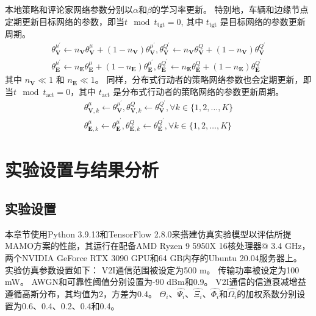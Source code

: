 本地策略和评论家网络参数分别以$\alpha$和$\beta$的学习率更新。
特别地，车辆和边缘节点定期更新目标网络的参数，即当$t \mod t_{\operatorname{tgt}} = 0$, 其中 $t_{\operatorname{tgt}}$ 是目标网络的参数更新周期。
\begin{align}
	\theta_{\mathbf{V}}^{\mu^{\prime}} \leftarrow n_{\mathbf{V}} \theta_{\mathbf{V}}^{\mu}+(1-n_{\mathbf{V}}) \theta_{\mathbf{V}}^{\mu^{\prime}}, \theta_{\mathbf{V}}^{Q^{\prime}} \leftarrow n_{\mathbf{V}} \theta_{\mathbf{V}}^{Q}+(1-n_{\mathbf{V}}) \theta_{\mathbf{V}}^{Q^{\prime}}\\
	\theta_{\mathbf{E}}^{\mu^{\prime}} \leftarrow n_{\mathbf{E}} \theta_{\mathbf{E}}^{\mu}+(1-n_{\mathbf{E}}) \theta_{\mathbf{E}}^{\mu^{\prime}}, \theta_{\mathbf{E}}^{Q^{\prime}} \leftarrow n_{\mathbf{E}} \theta_{\mathbf{E}}^{Q}+(1-n_{\mathbf{E}})  \theta_{\mathbf{E}}^{Q^{\prime}}
\end{align}
\noindent 其中 $n_{\mathbf{V}} \ll 1$ 和 $n_{\mathbf{E}} \ll 1$。
同样，分布式行动者的策略网络参数也会定期更新，即当$t \mod t_{\operatorname{act}} = 0$，其中 $t_{\operatorname{act}}$ 是分布式行动者的策略网络的参数更新周期。
\begin{align}
	\theta_{\mathbf{V}, k}^{\mu} \leftarrow \theta^{{\mu}^{\prime}}_{\mathbf{V}}, \theta_{\mathbf{V}, k}^{Q} \leftarrow \theta_{\mathbf{V}}^{Q^{\prime}}, \forall k \in \{1, 2, \ldots, K\}\\
	\theta_{\mathbf{E}, k}^{\mu} \leftarrow \theta_{\mathbf{E}}^{\mu^{\prime}}, \theta_{\mathbf{E}, k}^{Q} \leftarrow \theta_{\mathbf{E}}^{Q^{\prime}}, \forall k \in \{1, 2, \ldots, K\}
\end{align}

\section[\hspace{-2pt}实验设置与结果分析]{{ \hspace{-8pt}实验设置与结果分析}}\label{section 4-6}

\subsection[\hspace{-2pt}实验设置]{{ \hspace{-8pt}实验设置}}

本章节使用Python 3.9.13和TensorFlow 2.8.0来搭建仿真实验模型以评估所提MAMO方案的性能，其运行在配备AMD Ryzen 9 5950X 16核处理器@ 3.4 GHz，两个NVIDIA GeForce RTX 3090 GPU和64 GB内存的Ubuntu 20.04服务器上。
实验仿真参数设置如下：
V2I通信范围被设定为500 m。
传输功率被设定为100 mW。
AWGN和可靠性阈值分别设置为-90 dBm和0.9\cite{wang2019delay}。
V2I通信的信道衰减增益遵循高斯分布，其均值为2，方差为0.4\cite{sadek2009distributed}。
$\hat{\Theta_{i}}$、$\hat{\Psi_{i}}$、$\hat{\Xi_{i}}$、$\hat{\Phi_{i}}$和$\hat{\Omega_{i}}$的加权系数分别设置为0.6、0.4、0.2、0.4和0.4。

